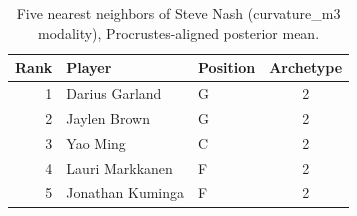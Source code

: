 \begin{table}[htbp]
  \centering\small
  \begin{tabular}{rllc}
    \toprule
    Rank & Player & Position & Archetype \\
    \midrule
    1 & Darius Garland & G & 2 \\
    2 & Jaylen Brown & G & 2 \\
    3 & Yao Ming & C & 2 \\
    4 & Lauri Markkanen & F & 2 \\
    5 & Jonathan Kuminga & F & 2 \\
    \bottomrule
  \end{tabular}
  \caption{Five nearest neighbors of Steve Nash (curvature_m3 modality), Procrustes-aligned posterior mean.}
  \label{tab:Steve_Nash_neighbors_curvature_m3}
\end{table}

